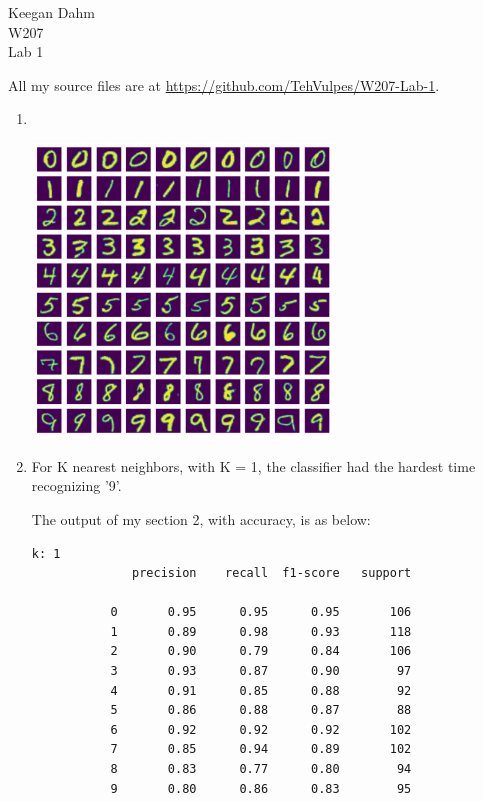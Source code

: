 \documentclass{article}
\begin{document}

\begin{flushright}
Keegan Dahm \\
W207 \\
Lab 1
\end{flushright}

All my source files are at \href{https://github.com/TehVulpes/W207-Lab-1}{https://github.com/TehVulpes/W207-Lab-1}.

\begin{enumerate}[start=1]
\item %
    ~\\
    \begin{center}\includegraphics[width=8cm]{1.png}\end{center}

\item %
    For K nearest neighbors, with K = 1, the classifier had the hardest time recognizing '9'.
    
    The output of my section 2, with accuracy, is as below:
    
    \begin{Verbatim}[commandchars=+\[\]]
k: 1
              precision    recall  f1-score   support

           0       0.95      0.95      0.95       106
           1       0.89      0.98      0.93       118
           2       0.90      0.79      0.84       106
           3       0.93      0.87      0.90        97
           4       0.91      0.85      0.88        92
           5       0.86      0.88      0.87        88
           6       0.92      0.92      0.92       102
           7       0.85      0.94      0.89       102
           8       0.83      0.77      0.80        94
           9       0.80      0.86      0.83        95


\end{Verbatim}
\end{enumerate}
\end{document}
